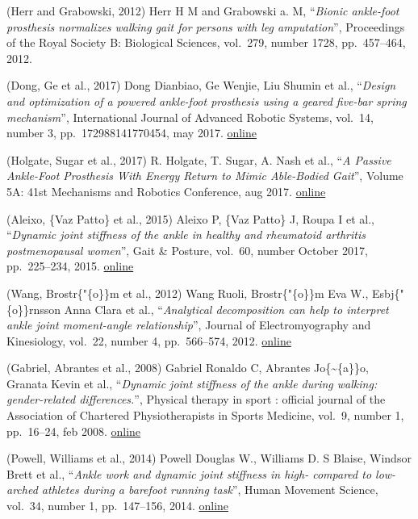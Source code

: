 \documentclass[11pt]{article}
\begin{document}
(Herr and Grabowski, 2012) Herr H M and Grabowski a. M, ``\emph{Bionic
ankle-foot prosthesis normalizes walking gait for persons with leg
amputation}'', Proceedings of the Royal Society B: Biological Sciences,
vol.~279, number 1728, pp.~457--464, 2012.

(Dong, Ge et al., 2017) Dong Dianbiao, Ge Wenjie, Liu Shumin et al.,
``\emph{Design and optimization of a powered ankle-foot prosthesis using
a geared five-bar spring mechanism}'', International Journal of Advanced
Robotic Systems, vol.~14, number 3, pp.~172988141770454, may 2017.
\href{http://journals.sagepub.com/doi/10.1177/1729881417704545}{online}

(Holgate, Sugar et al., 2017) R. Holgate, T. Sugar, A. Nash et al.,
``\emph{A Passive Ankle-Foot Prosthesis With Energy Return to Mimic
Able-Bodied Gait}'', Volume 5A: 41st Mechanisms and Robotics Conference,
aug 2017.
\href{http://proceedings.asmedigitalcollection.asme.org/proceeding.aspx?doi=10.1115/DETC2017-67192}{online}

(Aleixo, \{Vaz Patto\} et al., 2015) Aleixo P, \{Vaz Patto\} J, Roupa I
et al., ``\emph{Dynamic joint stiffness of the ankle in healthy and
rheumatoid arthritis postmenopausal women}'', Gait \& Posture, vol.~60,
number October 2017, pp.~225--234, 2015.
\href{https://doi.org/10.1016/j.gaitpost.2017.12.008}{online}

(Wang, Brostr\{"\{o\}\}m et al., 2012) Wang Ruoli, Brostr\{"\{o\}\}m Eva
W., Esbj\{"\{o\}\}rnsson Anna Clara et al., ``\emph{Analytical
decomposition can help to interpret ankle joint moment-angle
relationship}'', Journal of Electromyography and Kinesiology, vol.~22,
number 4, pp.~566--574, 2012.
\href{http://dx.doi.org/10.1016/j.jelekin.2012.04.005}{online}

(Gabriel, Abrantes et al., 2008) Gabriel Ronaldo C, Abrantes
Jo\{\textasciitilde{}\{a\}\}o, Granata Kevin et al., ``\emph{Dynamic
joint stiffness of the ankle during walking: gender-related
differences.}'', Physical therapy in sport : official journal of the
Association of Chartered Physiotherapists in Sports Medicine, vol.~9,
number 1, pp.~16--24, feb 2008.
\href{http://www.sciencedirect.com/science/article/pii/S1466853X07000776}{online}

(Powell, Williams et al., 2014) Powell Douglas W., Williams D. S Blaise,
Windsor Brett et al., ``\emph{Ankle work and dynamic joint stiffness in
high- compared to low-arched athletes during a barefoot running task}'',
Human Movement Science, vol.~34, number 1, pp.~147--156, 2014.
\href{http://dx.doi.org/10.1016/j.humov.2014.01.007}{online}
\end{document}
